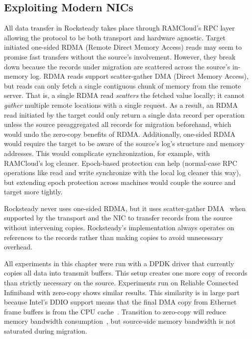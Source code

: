 \subsection{Exploiting Modern NICs}
\label{sec:hw}
All data transfer in Rocksteady takes place through RAMCloud's RPC layer
allowing the protocol to be both transport and hardware agnostic. Target
initiated one-sided RDMA (Remote Direct Memory Access) reads may seem to
promise fast transfers without the
source's involvement. However, they break down because the records under migration are
scattered across the source's in-memory log. RDMA reads support
scatter-gather DMA (Direct Memory Access), but reads can only fetch a
single contiguous chunk of
memory from the remote server. That is, a single RDMA read {\em scatters} the
fetched value locally; it cannot {\em gather} multiple remote locations with a
single request. As a result, an RDMA read initiated by the target could only
return a single data record per operation unless the source
preaggregated all records for migration beforehand, which would undo the
zero-copy benefits of RDMA.
Additionally, one-sided RDMA would require the target
to be aware of the source's log's structure and memory addresses. This
would complicate synchronization, for example, with RAMCloud's log cleaner.
Epoch-based protection can help (normal-case RPC operations like read and write
synchronize with the local log cleaner this way), but extending epoch
protection across machines would couple the source and target more
tightly.

Rocksteady never uses one-sided RDMA, but it uses scatter-gather
DMA~\cite{ramcloud} when supported by the transport and the NIC to transfer
records from the source without intervening copies.
Rocksteady's implementation always operates on references to 
the records rather than making copies to avoid
unnecessary overhead.

All experiments in this chapter were run with a DPDK driver that currently
copies all data into transmit buffers. This setup creates one more copy of records
than strictly necessary on the source. Experiments run on Reliable
Connected Infiniband with zero-copy shows
similar results. This similarity is in large part because Intel's DDIO
support means that
the final DMA copy from Ethernet frame buffers is from the CPU
cache~\cite{ddio}.
Transition to zero-copy will reduce memory bandwidth
consumption~\cite{kesavan:copy}, but source-side memory bandwidth is not
saturated during migration.


